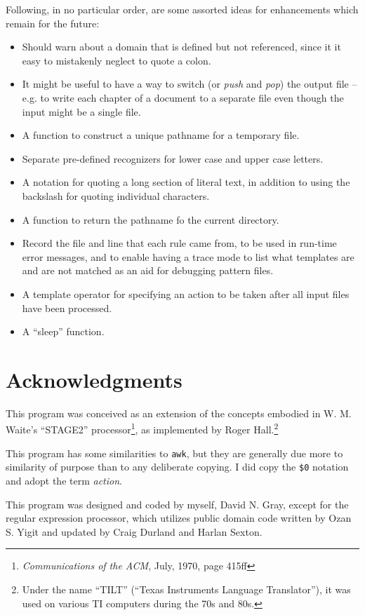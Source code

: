 Following, in no particular order, are some assorted ideas for
enhancements which remain for the future:
\begin{itemize}
\item Should warn about a domain that is defined but not referenced,
since it it easy to mistakenly neglect to quote a colon.
\item It might be useful to have a way to switch 
(or {\em push} and {\em pop}) the output
file -- e.g. to write each chapter of a document to a separate file
even though the input might be a single file.
\item A function to construct a unique pathname for a temporary file.
\item Separate pre-defined recognizers for lower case and upper case letters.
\item A notation for quoting a long section of
literal text, in addition to using the backslash for quoting individual
characters.
\item A function to return the pathname fo the current directory.
\item Record the file and line that each rule came from, to be used in
run-time error messages, and to enable having a trace mode to list what
templates are and are not matched as an aid for debugging pattern files.
\item A template operator for specifying an action to be taken after all
input files have been processed.
\item A ``sleep'' function.
\end{itemize}

\section{Acknowledgments}

This program was conceived as an extension of the concepts
embodied in W. M. Waite's ``STAGE2'' processor\footnote{{\em
Communications of the ACM}, July, 1970, page 415ff}, as implemented by
Roger Hall.\footnote{Under the name ``TILT'' (``Texas Instruments
Language Translator''), it was used on various TI computers during the
70s and 80s.}

This program has some similarities to {\tt awk}, but
they are generally due more to similarity of purpose than to any
deliberate copying.  I did copy the \verb/$0/ notation and adopt the term
{\em action}.

This program was designed and coded by myself, David N. Gray, except for the
regular expression processor, which utilizes public domain code written
by Ozan S. Yigit and updated by Craig Durland and Harlan Sexton.
